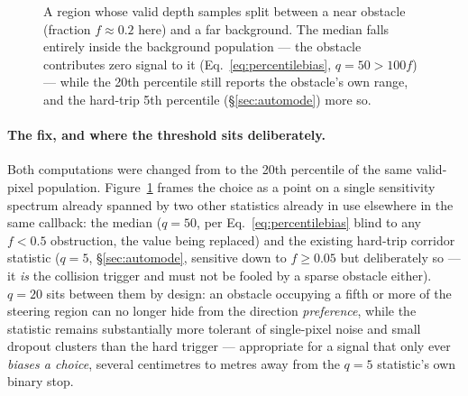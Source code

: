 \begin{figure}[htbp]
\centering
{}
\caption{A region whose valid depth samples split between a near obstacle
(fraction $f\approx0.2$ here) and a far background. The median falls
entirely inside the background population — the obstacle contributes zero
signal to it (Eq.~\ref{eq:percentilebias}, $q=50 > 100f$) — while the 20th
percentile still reports the obstacle's own range, and the hard-trip 5th
percentile (\S\ref{sec:automode}) more so.}
\label{fig:percentilebias}
\end{figure}

\paragraph{The fix, and where the threshold sits deliberately.}
Both computations were changed from  to the 20th percentile
of the same valid-pixel population. Figure~\ref{fig:percentilebias} frames
the choice as a point on a single sensitivity spectrum already spanned by
two other statistics already in use elsewhere in the same callback: the
median ($q=50$, per Eq.~\ref{eq:percentilebias} blind to any $f<0.5$
obstruction, the value being replaced) and the existing hard-trip corridor
statistic ($q=5$, \S\ref{sec:automode}, sensitive down to $f\ge0.05$ but
deliberately so — it \emph{is} the collision trigger and must not be
fooled by a sparse obstacle either). $q=20$ sits between them by design: an
obstacle occupying a fifth or more of the steering region can no longer
hide from the direction \emph{preference}, while the statistic remains
substantially more tolerant of single-pixel noise and small dropout
clusters than the hard trigger — appropriate for a signal that only ever
\emph{biases a choice}, several centimetres to metres away from the
$q=5$ statistic's own binary stop.

